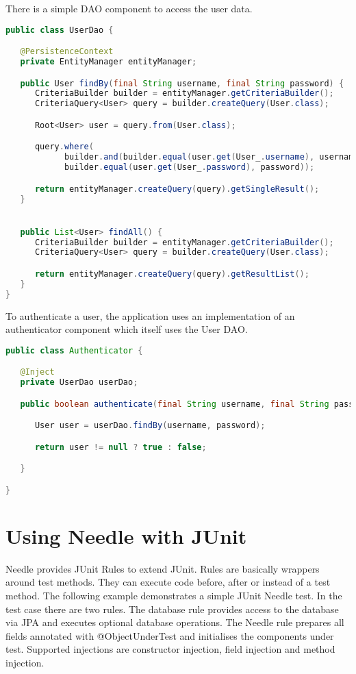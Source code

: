 \parskip 14pt
\parindent 0pt
There is a simple DAO component to access the user data.

\begin{lstlisting}[language={JAVA},caption=The User DAO component]
public class UserDao {

   @PersistenceContext
   private EntityManager entityManager;

   public User findBy(final String username, final String password) {
      CriteriaBuilder builder = entityManager.getCriteriaBuilder();
      CriteriaQuery<User> query = builder.createQuery(User.class);

      Root<User> user = query.from(User.class);

      query.where(
            builder.and(builder.equal(user.get(User_.username), username)),
            builder.equal(user.get(User_.password), password));

      return entityManager.createQuery(query).getSingleResult();
   }


   public List<User> findAll() {
      CriteriaBuilder builder = entityManager.getCriteriaBuilder();
      CriteriaQuery<User> query = builder.createQuery(User.class);

      return entityManager.createQuery(query).getResultList();
   }
}
\end{lstlisting}

\parskip 14pt
\parindent 0pt
To authenticate a user, the application uses an implementation of an authenticator component which itself uses the User DAO.

\begin{lstlisting}[language={JAVA},caption=The authenticator component]
public class Authenticator {

   @Inject
   private UserDao userDao;

   public boolean authenticate(final String username, final String password) {

      User user = userDao.findBy(username, password);

      return user != null ? true : false;

   }

}
\end{lstlisting}

\section{Using Needle with JUnit}
\label{sec: JUnit}

Needle provides JUnit Rules to extend JUnit. Rules are basically wrappers around test methods.
They can execute code before, after or instead of a test method.
The following example demonstrates a simple JUnit Needle test. In the test case there are two rules.
The database rule provides access to the database via JPA and executes optional database operations.
The Needle rule prepares all fields annotated with @ObjectUnderTest and initialises the components under test.
Supported injections are constructor injection, field injection and method injection.

